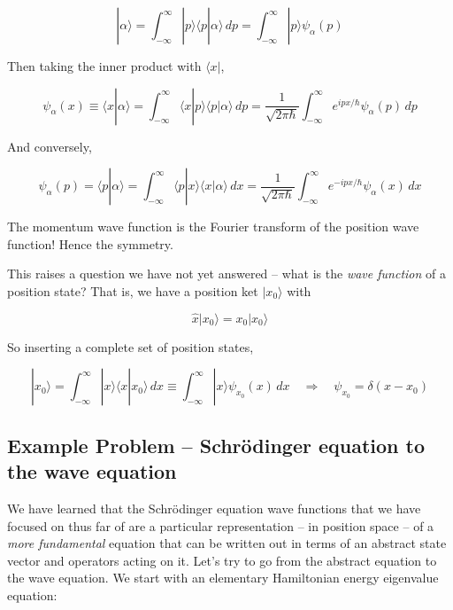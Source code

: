 \[
|\alpha\rangle = \int_{-\infty}^{\infty} |p\rangle \langle p |\alpha\rangle \,
dp = \int_{-\infty}^{\infty} |p\rangle \psi_\alpha (p)
\] \vspace{3px}

Then taking the inner product with $\langle x |$, 

 \[
\psi_\alpha(x) \equiv \langle x | \alpha \rangle = \int_{-\infty}^{\infty}
\langle x | p\rangle \langle p |\alpha \rangle \, dp
= \frac{1}{\sqrt{2\pi\hbar}} \int_{-\infty}^{\infty} e^{ipx / \hbar}
\psi_\alpha(p) \, dp
\] \vspace{3px}

And conversely, 

\[
\psi_\alpha(p) = \langle p | \alpha \rangle = \int_{-\infty}^{\infty}  \langle
p|x\rangle \langle x|\alpha \rangle \, dx = \frac{1}{\sqrt{2\pi\hbar}}
\int_{-\infty}^{\infty} e^{-ipx / \hbar} \psi_\alpha(x) \, dx
\] \vspace{3px}

The momentum wave function is the Fourier transform of the position wave
function! Hence the symmetry. 


This raises a question we have not yet answered -- what is the \textit{wave
function} of a position state? That is, we have a position ket $| x_0 \rangle$
with 

\[
\hat{x} |x_0\rangle = x_0|x_0\rangle
\] \vspace{3px}

So inserting a complete set of position states, 

\[
|x_0\rangle = \int_{-\infty}^{\infty}  |x\rangle \langle x|x_0 \rangle \, dx
\equiv \int_{-\infty}^{\infty} |x\rangle \psi_{x_0}(x) \, dx \quad \Rightarrow
\quad \psi_{x_0} = \delta(x - x_0)
\] \vspace{3px}

\subsection{Example Problem --  Schr\"odinger equation to the wave equation} 

We have learned that the Schr\"odinger equation wave functions that we have
focused on thus far of are a particular representation -- in position space --
of a \textit{more fundamental} equation that can be written out in terms of an
abstract state vector and operators acting on it. Let's try to go from the
abstract equation to the wave equation. We start with an elementary Hamiltonian
energy eigenvalue equation: 

